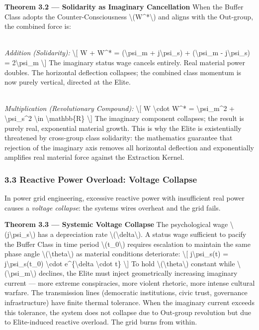 {\textbf{Theorem 3.2 --- Solidarity as Imaginary Cancellation} When the
Buffer Class adopts the Counter-Consciousness
\textbackslash(W\^{}*\textbackslash) and aligns with the Out-group, the
combined force is:\\
\strut \\
\emph{Addition (Solidarity):} \textbackslash{[} W + W\^{}* =
(\textbackslash psi\_m + j\textbackslash psi\_s) +
(\textbackslash psi\_m - j\textbackslash psi\_s) =
2\textbackslash psi\_m \textbackslash{]} The imaginary status wage
cancels entirely. Real material power doubles. The horizontal deflection
collapses; the combined class momentum is now purely vertical, directed
at the Elite.\\
\strut \\
\emph{Multiplication (Revolutionary Compound):} \textbackslash{[} W
\textbackslash cdot W\^{}* = \textbackslash psi\_m\^{}2 +
\textbackslash psi\_s\^{}2 \textbackslash in \textbackslash mathbb\{R\}
\textbackslash{]} The imaginary component collapses; the result is
purely real, exponential material growth. This is why the Elite is
existentially threatened by cross-group class solidarity: the
mathematics guarantee that rejection of the imaginary axis removes all
horizontal deflection and exponentially amplifies real material force
against the Extraction Kernel.

\subsubsection{3.3 Reactive Power Overload: Voltage
Collapse}\label{reactive-power-overload-voltage-collapse}

In power grid engineering, excessive reactive power with insufficient
real power causes a \emph{voltage collapse}: the
system\textquotesingle s wires overheat and the grid fails.

\textbf{Theorem 3.3 --- Systemic Voltage Collapse} The psychological
wage \textbackslash(j\textbackslash psi\_s\textbackslash) has a
depreciation rate \textbackslash(\textbackslash delta\textbackslash). A
status wage sufficient to pacify the Buffer Class in time period
\textbackslash(t\_0\textbackslash) requires escalation to maintain the
same phase angle \textbackslash(\textbackslash theta\textbackslash) as
material conditions deteriorate: \textbackslash{[}
j\textbackslash psi\_s(t) = j\textbackslash psi\_s(t\_0)
\textbackslash cdot e\^{}\{\textbackslash delta \textbackslash cdot t\}
\textbackslash{]} To hold
\textbackslash(\textbackslash theta\textbackslash) constant while
\textbackslash(\textbackslash psi\_m\textbackslash) declines, the Elite
must inject geometrically increasing imaginary current --- more extreme
conspiracies, more violent rhetoric, more intense cultural warfare. The
transmission lines (democratic institutions, civic trust, governance
infrastructure) have finite thermal tolerance. When the imaginary
current exceeds this tolerance, the system does not collapse due to
Out-group revolution but due to Elite-induced reactive overload. The
grid burns from within.

}
